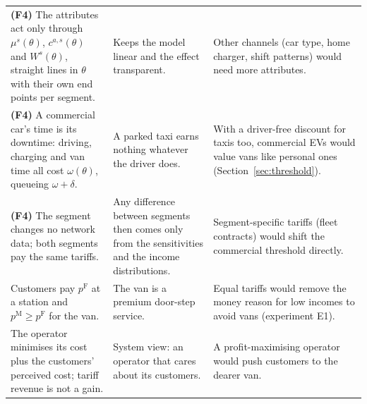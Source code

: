 \begin{xltabular}{\textwidth}{@{}>{\raggedright\arraybackslash}p{4.6cm}>{\raggedright\arraybackslash}p{5.2cm}X@{}}
\textbf{(F4)} The attributes act only through $\mu^{s}(\theta)$, $c^{a,s}(\theta)$ and $W^{s}(\theta)$, straight lines in $\theta$ with their own end points per segment. & Keeps the model linear and the effect transparent. & Other channels (car type, home charger, shift patterns) would need more attributes. \\
\textbf{(F4)} A commercial car's time is its downtime: driving, charging and van time all cost $\omega(\theta)$, queueing $\omega+\delta$. & A parked taxi earns nothing whatever the driver does. & With a driver-free discount for taxis too, commercial EVs would value vans like personal ones (Section~\ref{sec:threshold}). \\
\textbf{(F4)} The segment changes no network data; both segments pay the same tariffs. & Any difference between segments then comes only from the sensitivities and the income distributions. & Segment-specific tariffs (fleet contracts) would shift the commercial threshold directly. \\
Customers pay $p^{\mathrm F}$ at a station and $p^{\mathrm M}\ge p^{\mathrm F}$ for the van. & The van is a premium door-step service. & Equal tariffs would remove the money reason for low incomes to avoid vans (experiment E1). \\
The operator minimises its cost plus the customers' perceived cost; tariff revenue is not a gain. & System view: an operator that cares about its customers. & A profit-maximising operator would push customers to the dearer van. \\
\bottomrule
\end{xltabular}

